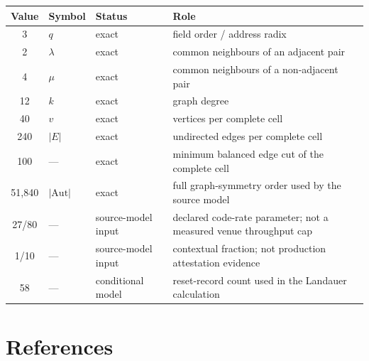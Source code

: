 \documentclass[11pt,letterpaper]{article}
\begin{document}
\begin{center}
\renewcommand{\arraystretch}{1.2}
\begin{tabular}{@{}c l p{} p{}@{}}
\toprule
\textbf{Value} & \textbf{Symbol} & \textbf{Status} & \textbf{Role} \\
\midrule
3 & $q$ & exact & field order / address radix\\
2 & $\lambda$ & exact & common neighbours of an adjacent pair\\
4 & $\mu$ & exact & common neighbours of a non-adjacent pair\\
12 & $k$ & exact & graph degree\\
40 & $v$ & exact & vertices per complete cell\\
240 & $|E|$ & exact & undirected edges per complete cell\\
100 & --- & exact & minimum balanced edge cut of the complete cell\\
51{,}840 & $|\mathrm{Aut}|$ & exact & full graph-symmetry order used by the source model\\
27/80 & --- & source-model input & declared code-rate parameter; not a measured venue throughput cap\\
1/10 & --- & source-model input & contextual fraction; not production attestation evidence\\
58 & --- & conditional model & reset-record count used in the Landauer calculation\\
\bottomrule
\end{tabular}
\end{center}

\section{References}
\end{document}

